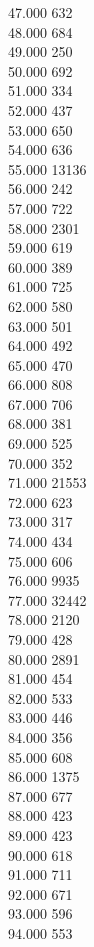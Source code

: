 { 47.000	632 \\
 48.000	684 \\
 49.000	250 \\
 50.000	692 \\
 51.000	334 \\
 52.000	437 \\
 53.000	650 \\
 54.000	636 \\
 55.000	13136 \\
 56.000	242 \\
 57.000	722 \\
 58.000	2301 \\
 59.000	619 \\
 60.000	389 \\
 61.000	725 \\
 62.000	580 \\
 63.000	501 \\
 64.000	492 \\
 65.000	470 \\
 66.000	808 \\
 67.000	706 \\
 68.000	381 \\
 69.000	525 \\
 70.000	352 \\
 71.000	21553 \\
 72.000	623 \\
 73.000	317 \\
 74.000	434 \\
 75.000	606 \\
 76.000	9935 \\
 77.000	32442 \\
 78.000	2120 \\
 79.000	428 \\
 80.000	2891 \\
 81.000	454 \\
 82.000	533 \\
 83.000	446 \\
 84.000	356 \\
 85.000	608 \\
 86.000	1375 \\
 87.000	677 \\
 88.000	423 \\
 89.000	423 \\
 90.000	618 \\
 91.000	711 \\
 92.000	671 \\
 93.000	596 \\
 94.000	553 \\
}

